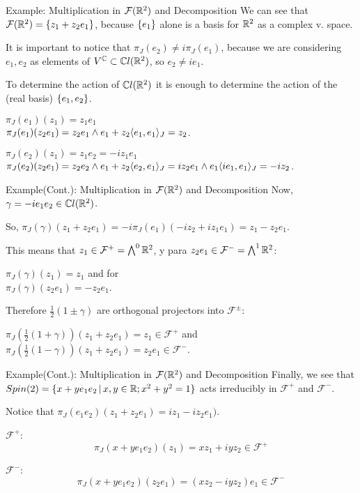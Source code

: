 \begin{frame}{Example: Multiplication in $\mathcal F(\mathbb R^2)$ and Decomposition} %
    We can see that $\mathcal F(\mathbb R^2) = \{z_1 + z_2 e_1\}$, because $\{e_1\}$ alone is a basis for $\mathbb R^2$ as a complex v. space.
    
    It is important to notice that $\pi_J(e_2) \neq i \pi_J(e_1)$, because we are considering $e_1, e_2$ as elements of $V^\mathbb C \subset \mathbb C l(\mathbb R^2)$, so $e_2 \neq i e_1$.
    
    To determine the action of $\mathbb C l(\mathbb R^2)$ it is enough to determine the action of the (real basis) $\{e_1, e_2\}$.
    
    
    $\pi_J(e_1) (z_1) = z_1 e_1$\\
    $\pi_J(e_1)(z_2 e_1) = z_2 e_1 \wedge e_1 + z_2 \langle e_1, e_1\rangle_J = z_2$.
    
    
    $\pi_J(e_2) (z_1) = z_1 e_2 = -i z_1 e_1$ \\
    $\pi_J(e_2)(z_2 e_1) = z_2 e_2 \wedge e_1 + z_2 \langle e_2, e_1\rangle_J = i z_2 e_1 \wedge e_1 \langle i e_1, e_1 \rangle_J = -i z_2$.
    
\end{frame}

\begin{frame}{Example(Cont.): Multiplication in $\mathcal F(\mathbb R^2)$ and Decomposition} %
    Now, $\gamma = -i e_1 e_2 \in \mathbb C l(\mathbb R^2)$.
    
    So, $\pi_J(\gamma) (z_1 + z_2 e_1) = -i \pi_J(e_1)(-iz_2 + iz_1e_1) = z_1 - z_2 e_1$.
    
   This means that $z_1 \in \mathcal F ^+ = \bigwedge^0 \mathbb R^2$, y para $z_2 e_1 \in \mathcal F ^- = \bigwedge^1 \mathbb R^2$:
    
    $\pi_J(\gamma)(z_1) = z_1$ \quad and for \\
    $\pi_J(\gamma)(z_2 e_1) = -z_2 e_1$.
    
    Therefore $\frac{1}{2}(1 \pm \gamma)$ are orthogonal projectors into $\mathcal F^\pm$:
    
    $\pi_J(\frac{1}{2}(1+\gamma))(z_1 + z_2e_1) = z_1 \in \mathcal F^+$ \quad and\\
    $\pi_J(\frac{1}{2}(1-\gamma))(z_1 + z_2e_1) = z_2 e_1 \in \mathcal F^-$.

\end{frame}

\begin{frame}{Example(Cont.): Multiplication in $\mathcal F(\mathbb R^2)$ and Decomposition} %
    Finally, we see that $Spin(2) = \{x + y e_1 e_2 \,|\, x, y \in \mathbb R; x^2 + y^2 = 1\}$ acts irreducibly in $\mathcal F^+$ and $\mathcal F^-$.
    
    Notice that $\pi_J(e_1 e_2)(z_1 + z_2 e_1) = iz_1 -iz_2 e_1)$.
    
    $\mathcal F^+$:
        \[ \pi_J(x + y e_1 e_2)(z_1) = xz_1 + iyz_2 \in \mathcal F^+\]
        
    $\mathcal F^-$:
        \[ \pi_J(x + y e_1 e_2)(z_2e_1) = (xz_2 - iyz_2)e_1 \in \mathcal F^-\]

\end{frame}

